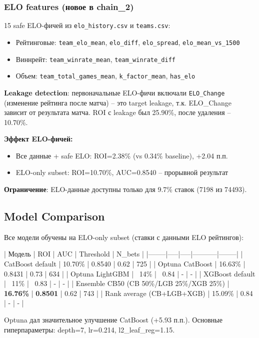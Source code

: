 \documentclass[12pt,a4paper]{article}
\begin{document}
\subsubsection{ELO features (новое в chain\_2)}
15 safe ELO-фичей из \texttt{elo\_history.csv} и \texttt{teams.csv}:
\begin{itemize}
  \item Рейтинговые: \texttt{team\_elo\_mean}, \texttt{elo\_diff}, \texttt{elo\_spread}, \texttt{elo\_mean\_vs\_1500}
  \item Виннрейт: \texttt{team\_winrate\_mean}, \texttt{team\_winrate\_diff}
  \item Объем: \texttt{team\_total\_games\_mean}, \texttt{k\_factor\_mean}, \texttt{has\_elo}
\end{itemize}

\textbf{Leakage detection}: первоначальные ELO-фичи включали \texttt{ELO\_Change} (изменение рейтинга после матча) -- это target leakage, т.к. ELO\_Change зависит от результата матча. ROI с leakage был 25.90\%, после удаления -- 10.70\%.

\textbf{Эффект ELO-фичей:}
\begin{itemize}
  \item Все данные + safe ELO: ROI=2.38\% (vs 0.34\% baseline), +2.04 п.п.
  \item ELO-only subset: ROI=10.70\%, AUC=0.8540 -- прорывной результат
\end{itemize}

\textbf{Ограничение}: ELO-данные доступны только для 9.7\% ставок (7198 из 74493).

\subsection{Model Comparison}

Все модели обучены на ELO-only subset (ставки с данными ELO рейтингов):

| Модель | ROI | AUC | Threshold | N\_bets |
|--------|-----|-----|-----------|--------|
| CatBoost default | 10.70\% | 0.8540 | 0.62 | 725 |
| Optuna CatBoost | 16.63\% | 0.8431 | 0.73 | 634 |
| Optuna LightGBM | ~14\% | ~0.84 | - | - |
| XGBoost default | ~11\% | ~0.83 | - | - |
| Ensemble CB50 (CB 50\%/LGB 25\%/XGB 25\%) | \textbf{16.76\%} | \textbf{0.8501} | 0.62 | 743 |
| Rank average (CB+LGB+XGB) | 15.09\% | 0.84 | - | - |

Optuna дал значительное улучшение CatBoost (+5.93 п.п.). Основные гиперпараметры: depth=7, lr=0.214, l2\_leaf\_reg=1.15.
\end{document}
